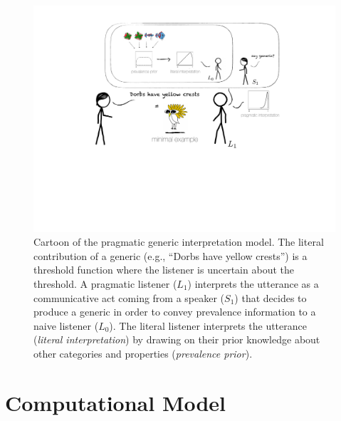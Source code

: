 \documentclass[floatsintext,doc]{apa6}
\newcommand{\mht}[1]{{\textcolor{Blue}{[mht: #1]}}}
\newcommand{\ndg}[1]{{\textcolor{Green}{[ndg: #1]}}}
\begin{document}
\begin{figure}
\centering
\includegraphics{figs/cartoon3.pdf}
\caption{\label{fig:cartoon}Cartoon of the pragmatic generic interpretation model. The literal contribution of a generic (e.g., \enquote{Dorbs have yellow crests}) is a threshold function where the listener is uncertain about the threshold. 
A pragmatic listener (\(L_1\)) interprets the utterance as a communicative act coming from a speaker (\(S_1\)) that decides to produce a generic in order to convey prevalence information to a naive listener (\(L_0\)). 
The literal listener interprets the utterance (\emph{literal interpretation}) by drawing on their prior knowledge about other categories and properties (\emph{prevalence prior}).}
\end{figure}

\hypertarget{computational-model}{%
\section{Computational Model}\label{computational-model}}
\end{document}
